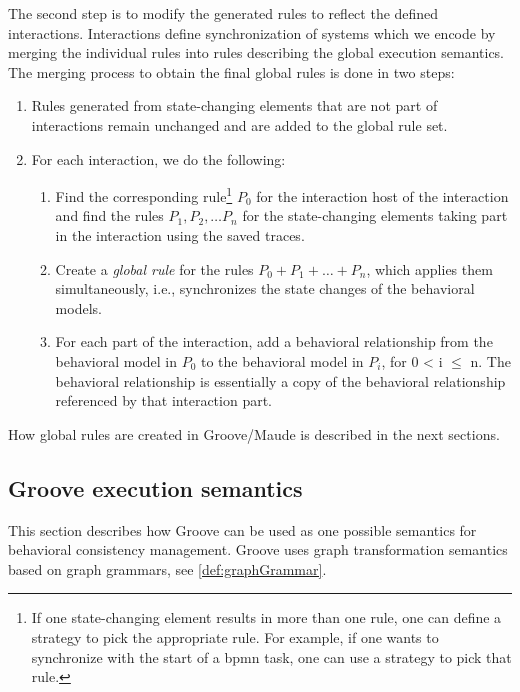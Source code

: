 \documentclass{jot}
\begin{document}
The second step is to modify the generated rules to reflect the defined interactions.
Interactions define synchronization of systems which we encode by merging the individual rules into rules describing the global execution semantics.
The merging process to obtain the final global rules is done in two steps:

\begin{enumerate}
    \item Rules generated from state-changing elements that are not part of interactions remain unchanged and are added to the global rule set.
    \item For each interaction, we do the following:
     \begin{enumerate}
         \item Find the corresponding rule\footnote{If one state-changing element results in more than one rule, one can define a strategy to pick the appropriate rule.
         For example, if one wants to synchronize with the start of a \gls*{bpmn} task, one can use a strategy to pick that rule.} $P_0$ for the interaction host of the interaction and find the rules $P_1, P_2, \ldots P_n$ for the state-changing elements taking part in the interaction using the saved traces.
         \item Create a \textit{global rule} for the rules $P_0 + P_1 + \ldots + P_n$, which applies them simultaneously, i.e., synchronizes the state changes of the behavioral models.
         \item For each part of the interaction, add a behavioral relationship from the behavioral model in $P_0$ to the behavioral model in $P_i$, for 0 < i $\leq$ n.
         The behavioral relationship is essentially a copy of the behavioral relationship referenced by that interaction part.
     \end{enumerate}
\end{enumerate}

How global rules are created in Groove/Maude is described in the next sections.

\subsection{Groove execution semantics} 
This section describes how Groove can be used as one possible semantics for behavioral consistency management.
Groove uses graph transformation semantics based on graph grammars, see \autoref{def:graphGrammar}.
\end{document}
